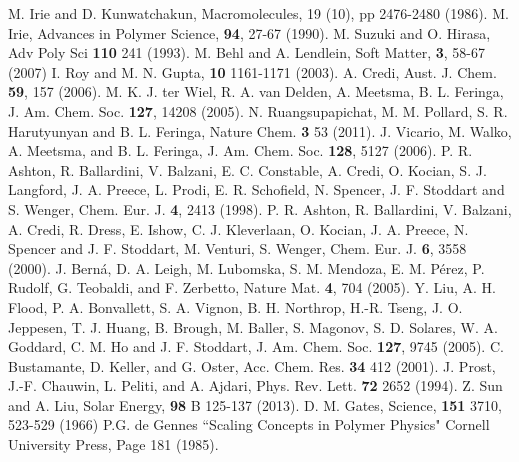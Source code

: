 \documentclass[journal = mamobx, manuscript = article]{achemso}
\begin{document}
\begin{thebibliography}{99}

 M. Irie and D. Kunwatchakun, 
Macromolecules, 19 (10), pp 2476-2480 (1986).
 M. Irie, 
Advances in Polymer Science, {\bf 94}, 27-67 (1990).
 M. Suzuki and O. Hirasa, 
Adv Poly Sci {\bf 110} 241 (1993).
 M. Behl and A. Lendlein, Soft Matter, {\bf 3}, 58-67 (2007) %
 I. Roy and M. N. Gupta, %
{\bf 10} 1161-1171 (2003).
 A. Credi, Aust. J. Chem. {\bf 59}, 157 (2006).
 M. K. J. ter Wiel, R. A. van Delden, A. Meetsma, B. L. Feringa, J. Am. Chem.
Soc. {\bf 127}, 14208 (2005).
 N. Ruangsupapichat, M. M. Pollard, S. R. Harutyunyan and B. L. Feringa, Nature Chem. {\bf 3} 53 (2011).
 J. Vicario, M. Walko, A. Meetsma, and B. L. Feringa, J. Am. Chem. Soc. {\bf 128},  5127 (2006).
 P. R. Ashton, R. Ballardini, V. Balzani, E. C. Constable, A. Credi, 
O. Kocian, S. J. Langford, J. A. Preece, L. Prodi, E. R. Schofield, N. Spencer, J. F. Stoddart 
and S. Wenger, Chem. Eur. J.  {\bf 4}, 2413 (1998).
 P. R. Ashton, R. Ballardini, V. Balzani, A. Credi, R. Dress,
E. Ishow, C. J. Kleverlaan, O. Kocian, J. A. Preece, N. Spencer and J. F.
Stoddart, M. Venturi, S. Wenger, Chem. Eur. J.  {\bf 6}, 3558 (2000).
 J. Bern\'a, D. A. Leigh, M. Lubomska, S. M. Mendoza, E. M. P\'erez, P. Rudolf, G.
Teobaldi, and F. Zerbetto, Nature Mat.  {\bf 4}, 704 (2005).
 Y. Liu, A. H. Flood, P. A. Bonvallett, S. A. Vignon, B. H. Northrop, H.-R.
Tseng, J. O. Jeppesen, T. J. Huang, B. Brough, M. Baller, S. Magonov, S. D.
Solares, W. A. Goddard, C. M. Ho and J. F. Stoddart, J. Am. Chem. Soc.  {\bf 127}, 9745 (2005).
 C. Bustamante, D. Keller, and G. Oster, Acc. Chem. Res. {\bf 34} 412 (2001).
 J. Prost, J.-F. Chauwin, L. Peliti, and  A. Ajdari, Phys. Rev.  Lett. {\bf 72} 2652 (1994).
 Z. Sun and A. Liu, Solar Energy, {\bf 98} B 125-137 (2013).
 D. M. Gates, Science, {\bf 151} 3710, 523-529 (1966)
 P.G. de Gennes ``Scaling Concepts in Polymer Physics" Cornell University Press, Page 181 (1985).

\end{thebibliography}
\end{document}
